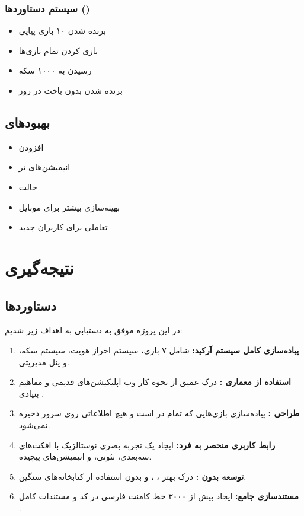 \documentclass[12pt,a4paper]{article}
\begin{document}
	\subsubsection{سیستم دستاوردها ()}
	\begin{itemize}
		\item برنده شدن ۱۰ بازی پیاپی
		\item بازی کردن تمام بازی‌ها
		\item رسیدن به ۱۰۰۰ سکه
		\item برنده شدن بدون باخت در روز
	\end{itemize}
	
	\subsection{بهبودهای }
	\begin{itemize}
		\item افزودن 
		\item انیمیشن‌های  تر
		\item حالت 
		\item بهینه‌سازی بیشتر برای موبایل
		\item {} تعاملی برای کاربران جدید
	\end{itemize}
	
	\section{نتیجه‌گیری}
	
	\subsection{دستاوردها}
	در این پروژه موفق به دستیابی به اهداف زیر شدیم:
	
	\begin{enumerate}
		\item \textbf{پیاده‌سازی کامل سیستم آرکید:} شامل ۷ بازی، سیستم احراز هویت، سیستم سکه، و پنل مدیریتی.
		\item \textbf{استفاده از معماری :} درک عمیق از نحوه کار وب اپلیکیشن‌های قدیمی و مفاهیم بنیادی .
		\item \textbf{طراحی :} پیاده‌سازی بازی‌هایی که تمام  در  است و هیچ اطلاعاتی روی سرور ذخیره نمی‌شود.
		\item \textbf{رابط کاربری منحصر به فرد:} ایجاد یک تجربه بصری نوستالژیک با افکت‌های سه‌بعدی، نئونی، و انیمیشن‌های پیچیده.
		\item \textbf{توسعه بدون :} درک بهتر ، ، و  بدون استفاده از کتابخانه‌های سنگین.
		\item \textbf{مستندسازی جامع:} ایجاد بیش از ۳۰۰۰ خط کامنت فارسی در کد و مستندات کامل .
	\end{enumerate}
	
\end{document}
